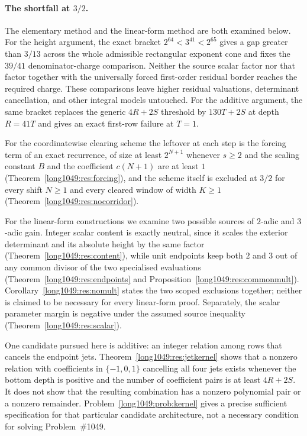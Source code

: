 \documentclass[11pt]{article}
\begin{document}
\paragraph{The shortfall at $3/2$.}
The elementary method and the linear-form method are both examined below.  For
the height argument, the exact bracket $2^{64}<3^{41}<2^{65}$ gives a gap greater
than $3/13$ across the whole admissible rectangular exponent cone and fixes the
$39/41$ denominator-charge comparison.  Neither the source scalar factor nor
that factor together with the universally forced first-order residual border
reaches the required charge.  These comparisons leave higher residual
valuations, determinant cancellation, and other integral models untouched.
For the additive argument, the same bracket replaces the generic
$4R+2S$ threshold by $130T+2S$ at depth $R=41T$ and gives an exact first-row
failure at $T=1$.

For
the coordinatewise clearing scheme the leftover at each step is the forcing
term of an exact recurrence, of size at least
$2^{N+1}$ whenever $s\ge2$ and the scaling constant $B$ and the coefficient
$c(N+1)$ are at least $1$
(Theorem~\ref{long1049:res:forcing}), and the
scheme itself is excluded at $3/2$ for every shift $N\ge1$ and every cleared
window of width $K\ge1$ (Theorem~\ref{long1049:res:nocorridor}).

For the linear-form
constructions we examine two possible sources of $2$-adic and $3$-adic gain.
Integer scalar content is exactly neutral, since it scales the exterior
determinant and its absolute height by the same factor
(Theorem~\ref{long1049:res:content}), while unit endpoints keep both $2$ and $3$ out of
any common divisor of the two specialised evaluations
(Theorem~\ref{long1049:res:endpoints} and Proposition~\ref{long1049:res:commonmult}).
Corollary~\ref{long1049:res:nomult} states the two scoped exclusions together; neither
is claimed to be necessary for every linear-form proof.  Separately, the scalar
parameter margin is negative under the assumed source inequality
(Theorem~\ref{long1049:res:scalar}).

One candidate pursued here is additive: an
integer relation among rows that cancels the endpoint jets.
Theorem~\ref{long1049:res:jetkernel} shows that a nonzero relation with coefficients in
$\{-1,0,1\}$ cancelling all four jets exists whenever the bottom depth is
positive and the number of coefficient pairs is at least $4R+2S$.  It does not
show that the resulting combination has a nonzero polynomial pair or a nonzero
remainder.  Problem~\ref{long1049:prob:kernel} gives a precise sufficient specification
for that particular candidate architecture, not a necessary condition for
solving Problem~\#1049.
\end{document}
